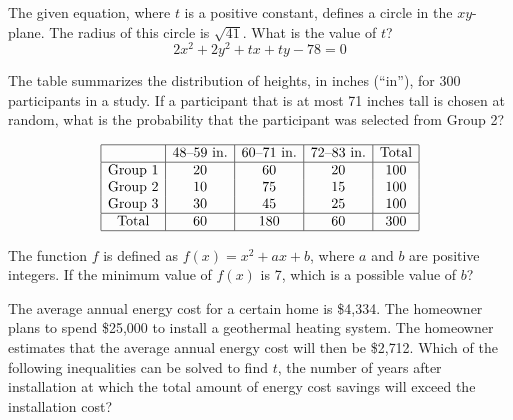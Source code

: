 The given equation, where \(t\) is a positive constant, defines a circle in the \(xy\)-plane.  
The radius of this circle is \(\sqrt{41}\).  
What is the value of \(t\)?  
\[
2x^2 + 2y^2 + tx + ty - 78 = 0
\]

\vspace{0.75em}

\noindent\markforreview
\vspace{1em}

The table summarizes the distribution of heights, in inches (``in''), for 300 participants in a study. If a participant that is at most 71 inches tall is chosen at random, what is the probability that the participant was selected from Group 2?

\[
\begin{array}{|c|c|c|c|c|}
\hline
 & \text{48--59 in.} & \text{60--71 in.} & \text{72--83 in.} & \text{Total} \\
\hline
\text{Group 1} & 20 & 60 & 20 & 100 \\
\text{Group 2} & 10 & 75 & 15 & 100 \\
\text{Group 3} & 30 & 45 & 25 & 100 \\
\hline
\text{Total} & 60 & 180 & 60 & 300 \\
\hline
\end{array}
\]

\vspace{2em}
\newpage
\noindent\markforreview
\vspace{1em}

The function \(f\) is defined as \(f(x) = x^2 + ax + b\), where \(a\) and \(b\) are positive integers. If the minimum value of \(f(x)\) is 7, which is a possible value of \(b\)?

\vspace{2em}

\noindent\markforreview
\vspace{1em}

The average annual energy cost for a certain home is \$4{,}334. The homeowner plans to spend \$25{,}000 to install a geothermal heating system. The homeowner estimates that the average annual energy cost will then be \$2{,}712. Which of the following inequalities can be solved to find \(t\), the number of years after installation at which the total amount of energy cost savings will exceed the installation cost?

